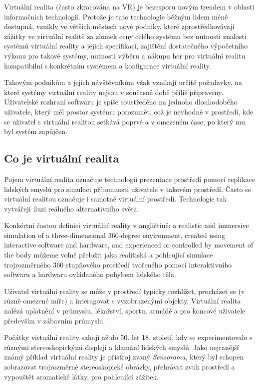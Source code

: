Virtuální realita (často zkracována na VR) je bezesporu novým trendem v
oblasti informačních technologií. Protože je tato technologie běžným
lidem méně dostupná, vznikly ve větších městech nové podniky, které
zprostředkovávají zážitky ve virtuální realitě za zlomek ceny celého
systému bez nutnosti znalosti systémů virtuální reality a jejich
specifikací, zajištění dostatečného výpočetního výkonu pro takové
systémy, nutnosti výběru a nákupu her pro virtuální realitu kompatibilní
s konkrétním systémem a konfigurace virtuální reality.

Takovým podnikům a jejich návštěvníkům však vznikají určité požadavky,
na které systémy virtuální reality nejsou v současné době příliš
připraveny. Uživatelské rozhraní softwaru je spíše soustředěno na
jednoho dlouhodobého uživatele, který měl prostor systému porozumět, což
je nevhodné v prostředí, kde se uživatel s virtuální realitou setkává
poprvé a v omezeném čase, po který mu byl systém zapůjčen.

\subsection{Co je virtuální
realita}\label{co-je-virtuuxe1lnuxed-realita}

Pojem virtuální realita označuje technologii prezentace prostředí pomocí
replikace lidských smyslů pro simulaci přítomnosti uživatele v takovém
prostředí. Často se virtuální realitou označuje i samotné virtuální
prostředí. Technologie tak vytvářejí iluzi reálného alternativního
světa.

Konkértní častou definici virtuální reality v angličtině: a realistic
and immersive simulation of a three-dimensional 360-degree environment,
created using interactive software and hardware, and experienced or
controlled by movement of the body můžeme volně přeložit jako
realitiská a pohlcující simulace trojrozměrného 360 stupňového
prostředí tvořeného pomocí interaktivního softwaru a hardwaru ovládaného
pohybem lidského těla.

Uživatel virtuální reality se může v prostředí typicky rozhlížet,
procházet se (v různě omezené míře) a interagovat s vyzobrazenými
objekty. Virtuální realita nalézá uplatnění v průmyslu, lékařství,
sportu, armádě a pro koncové uživatele především v zábavním průmyslu.

Počátky virtuální reality sahají až do 50. let 18. století, kdy se
experimentovalo s různými stereoskopickými displeji a klamání lidských
smyslů. Jako nejranější známý příklad virtuální reality je přístroj
zvaný \emph{Sensorama}, který byl schopen zobrazovat trojrozměrné
stereoskopické obrázky, přehrávat zvuk prostředí a vypouštět aromatické
látky, pro pohlcující zážitek.

